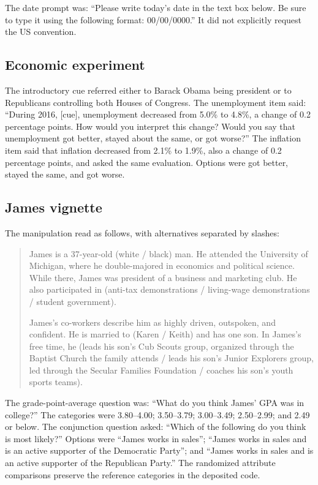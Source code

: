 \documentclass[11pt]{article}
\begin{document}
The date prompt was: ``Please write today's date in the text box below. Be sure to type it using the following format: 00/00/0000.'' It did not explicitly request the US convention.

\subsection{Economic experiment}

The introductory cue referred either to Barack Obama being president or to Republicans controlling both Houses of Congress. The unemployment item said: ``During 2016, [cue], unemployment decreased from 5.0\% to 4.8\%, a change of 0.2 percentage points. How would you interpret this change? Would you say that unemployment got better, stayed about the same, or got worse?'' The inflation item said that inflation decreased from 2.1\% to 1.9\%, also a change of 0.2 percentage points, and asked the same evaluation. Options were got better, stayed the same, and got worse.

\subsection{James vignette}

The manipulation read as follows, with alternatives separated by slashes:
\begin{quote}
James is a 37-year-old (white / black) man. He attended the University of Michigan, where he double-majored in economics and political science. While there, James was president of a business and marketing club. He also participated in (anti-tax demonstrations / living-wage demonstrations / student government).

James's co-workers describe him as highly driven, outspoken, and confident. He is married to (Karen / Keith) and has one son. In James's free time, he (leads his son's Cub Scouts group, organized through the Baptist Church the family attends / leads his son's Junior Explorers group, led through the Secular Families Foundation / coaches his son's youth sports teams).
\end{quote}

The grade-point-average question was: ``What do you think James' GPA was in college?'' The categories were 3.80--4.00; 3.50--3.79; 3.00--3.49; 2.50--2.99; and 2.49 or below. The conjunction question asked: ``Which of the following do you think is most likely?'' Options were ``James works in sales''; ``James works in sales and is an active supporter of the Democratic Party''; and ``James works in sales and is an active supporter of the Republican Party.'' The randomized attribute comparisons preserve the reference categories in the deposited code.
\endgroup
\end{document}
